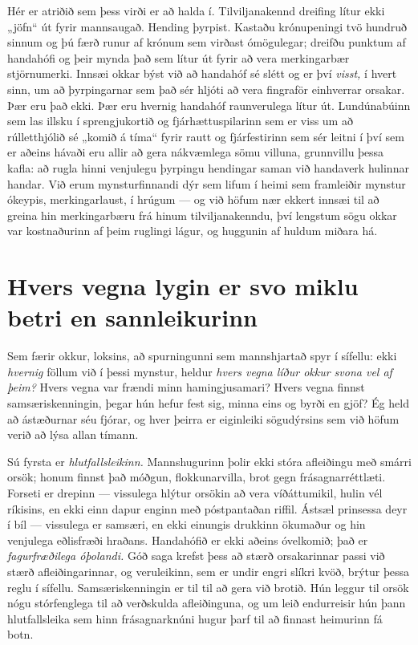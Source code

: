 Hér er atriðið sem þess virði er að halda í. Tilviljanakennd dreifing lítur ekki „jöfn“ út fyrir mannsaugað. Hending þyrpist. Kastaðu krónupeningi tvö hundruð sinnum og þú færð runur af krónum sem virðast ómögulegar; dreifðu punktum af handahófi og þeir mynda það sem lítur út fyrir að vera merkingarbær stjörnumerki. Innsæi okkar býst við að handahóf sé slétt og er því \emph{visst,} í hvert sinn, um að þyrpingarnar sem það sér hljóti að vera fingraför einhverrar orsakar. Þær eru það ekki. Þær eru hvernig handahóf raunverulega lítur út. Lundúnabúinn sem las illsku í sprengjukortið og fjárhættuspilarinn sem er viss um að rúlletthjólið sé „komið á tíma“ fyrir rautt og fjárfestirinn sem sér leitni í því sem er aðeins hávaði eru allir að gera nákvæmlega sömu villuna, grunnvillu þessa kafla: að rugla hinni venjulegu þyrpingu hendingar saman við handaverk hulinnar handar. Við erum mynsturfinnandi dýr sem lifum í heimi sem framleiðir mynstur ókeypis, merkingarlaust, í hrúgum — og við höfum nær ekkert innsæi til að greina hin merkingarbæru frá hinum tilviljanakenndu, því lengstum sögu okkar var kostnaðurinn af þeim ruglingi lágur, og huggunin af huldum miðara há.

\section*{Hvers vegna lygin er svo miklu betri en sannleikurinn}

Sem færir okkur, loksins, að spurningunni sem mannshjartað spyr í sífellu: ekki \emph{hvernig} föllum við í þessi mynstur, heldur \emph{hvers vegna líður okkur svona vel af þeim?} Hvers vegna var frændi minn hamingjusamari? Hvers vegna finnst samsæriskenningin, þegar hún hefur fest sig, minna eins og byrði en gjöf? Ég held að ástæðurnar séu fjórar, og hver þeirra er eiginleiki sögudýrsins sem við höfum verið að lýsa allan tímann.

Sú fyrsta er \emph{hlutfallsleikinn.} Mannshugurinn þolir ekki stóra afleiðingu með smárri orsök; honum finnst það móðgun, flokkunarvilla, brot gegn frásagnarréttlæti. Forseti er drepinn — vissulega hlýtur orsökin að vera víðáttumikil, hulin vél ríkisins, en ekki einn dapur enginn með póstpantaðan riffil. Ástsæl prinsessa deyr í bíl — vissulega er samsæri, en ekki einungis drukkinn ökumaður og hin venjulega eðlisfræði hraðans. Handahófið er ekki aðeins óvelkomið; það er \emph{fagurfræðilega óþolandi.} Góð saga krefst þess að stærð orsakarinnar passi við stærð afleiðingarinnar, og veruleikinn, sem er undir engri slíkri kvöð, brýtur þessa reglu í sífellu. Samsæriskenningin er til til að gera við brotið. Hún leggur til orsök nógu stórfenglega til að verðskulda afleiðinguna, og um leið endurreisir hún þann hlutfallsleika sem hinn frásagnarknúni hugur þarf til að finnast heimurinn fá botn.


